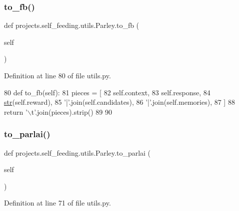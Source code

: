\subsubsection{\texorpdfstring{to\+\_\+fb()}{to\_fb()}}
{\footnotesize\ttfamily def projects.\+self\+\_\+feeding.\+utils.\+Parley.\+to\+\_\+fb (\begin{DoxyParamCaption}\item[{}]{self }\end{DoxyParamCaption})}



Definition at line 80 of file utils.\+py.


\begin{DoxyCode}
80     \textcolor{keyword}{def }to\_fb(self):
81         pieces = [
82             self.context,
83             self.response,
84             \hyperlink{namespacegenerate__task__READMEs_a5b88452ffb87b78c8c85ececebafc09f}{str}(self.reward),
85             \textcolor{stringliteral}{'|'}.join(self.candidates),
86             \textcolor{stringliteral}{'|'}.join(self.memories),
87         ]
88         \textcolor{keywordflow}{return} \textcolor{stringliteral}{'\(\backslash\)t'}.join(pieces).strip()
89 
90 
\end{DoxyCode}
\mbox{\label{classprojects_1_1self__feeding_1_1utils_1_1Parley_a9b27cd868de896ca91a229dd38b058f5}} 
\subsubsection{\texorpdfstring{to\+\_\+parlai()}{to\_parlai()}}
{\footnotesize\ttfamily def projects.\+self\+\_\+feeding.\+utils.\+Parley.\+to\+\_\+parlai (\begin{DoxyParamCaption}\item[{}]{self }\end{DoxyParamCaption})}



Definition at line 71 of file utils.\+py.


